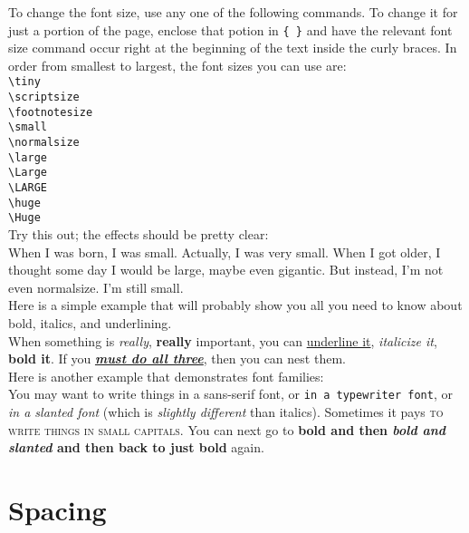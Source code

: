 To change the font size, use any one of the following commands. To change it for just a portion of the page, enclose that potion in \verb+{ }+ and have the relevant font size command occur right at the beginning of the text inside the curly braces. In order from smallest to largest, the font sizes you can use are:
\\
{\tiny{\verb+\tiny+}} \\
{\scriptsize{\verb+\scriptsize+}} \\
{\footnotesize{\verb+\footnotesize+}} \\
{\small{\verb+\small+}} \\
{\normalsize{\verb+\normalsize+}} \\
{\large{\verb+\large+}} \\
{\Large{\verb+\Large+}} \\
{\LARGE{\verb+\LARGE+}} \\
{\huge{\verb+\huge+}} \\ 
{\Huge{\verb+\Huge+}} \\

Try this out; the effects should be pretty clear:\\

When I was born, I was {\small small}. Actually, {\scriptsize I was very small}. When I got older, I thought some day {\Large I would be large}, {\Huge maybe even gigantic}. But instead, I'm not even normalsize. {\small I'm still small.}\\

Here is a simple example that will probably show you all you need to know about bold, italics, and underlining.\\

When something is \emph{really}, \textbf{really} important, you can \underline{underline it}, \emph{italicize it}, \textbf{bold it}. If you \underline{\textbf{\emph{must do all three}}}, then you can nest them.\\

Here is another example that demonstrates font families:\\

You may want to write things \textsf{in a sans-serif font}, or \texttt{in a typewriter font}, or \textsl{in a slanted font} (which is \emph{slightly different} than italics). Sometimes it pays \textsc{to write things in small capitals}. You can next go to \textbf{bold and then \textsl{bold and slanted} and then back to just bold} again.

\section{Spacing}


